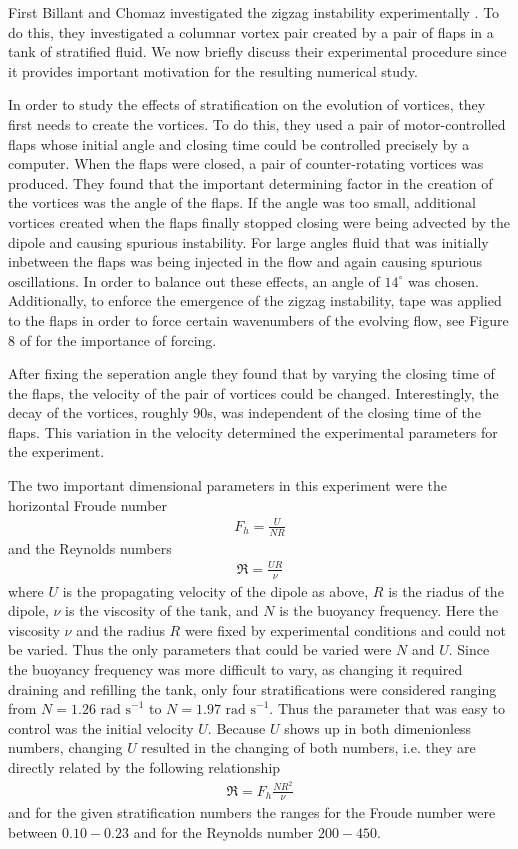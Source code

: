 First Billant and Chomaz investigated the zigzag instability experimentally \cite{bc2000a}. To do this, they investigated a columnar vortex pair created by a pair of flaps in a tank of stratified fluid. We now briefly discuss their experimental procedure since it provides important motivation for the resulting numerical study. 

In order to study the effects of stratification on the evolution of vortices, they first needs to create the vortices. To do this, they used a pair of motor-controlled flaps whose initial angle and closing time could be controlled precisely by a computer. When the flaps were closed, a pair of counter-rotating vortices was produced. They found that the important determining factor in the creation of the vortices was the angle of the flaps. If the angle was too small, additional vortices created when the flaps finally stopped closing were being advected by the dipole and causing spurious instability. For large angles fluid that was initially inbetween the flaps was being injected in the flow and again causing spurious oscillations. In order to balance out these effects, an angle of $14^{\circ}$ was chosen. Additionally, to enforce the emergence of the zigzag instability, tape was applied to the flaps in order to force certain wavenumbers of the evolving flow, see Figure 8 of \cite{bc2000a} for the importance of forcing. 

After fixing the seperation angle they found that by varying the closing time of the flaps, the velocity of the pair of vortices could be changed. Interestingly, the decay of the vortices, roughly $90$s, was independent of the closing time of the flaps. This variation in the velocity determined the experimental parameters for the experiment. 

The two important dimensional parameters in this experiment were the horizontal Froude number 
\begin{align}
F_{h} = \frac{U}{NR}
\end{align}
and the Reynolds numbers
\begin{align}
\Re= \frac{UR}{\nu}
\end{align}
where $U$ is the propagating velocity of the dipole as above, $R$ is the riadus of the dipole, $\nu$ is the viscosity of the tank, and $N$ is the buoyancy frequency. Here the viscosity $\nu$ and the radius $R$ were fixed by experimental conditions and could not be varied. Thus the only parameters that could be varied were $N$ and $U$. Since the buoyancy frequency was more difficult to vary, as changing it required draining and refilling the tank, only four stratifications were considered ranging from $N=1.26 \text{ rad s}^{-1}$ to $N=1.97 \text { rad s}^{-1}$. Thus the parameter that was easy to control was the initial velocity $U$. Because $U$ shows up in both dimenionless numbers, changing $U$ resulted in the changing of both numbers, i.e. they are directly related by the following relationship 
\begin{align}
\Re = F_{h}\frac{NR^{2}}{\nu}
\end{align} 
and for the given stratification numbers the ranges for the Froude number were between $0.10 - 0.23$ and for the Reynolds number $200-450$.

